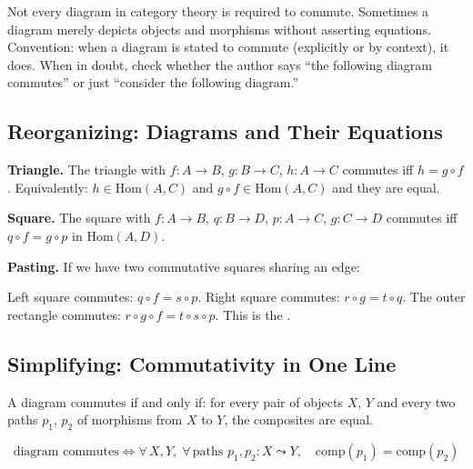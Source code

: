 Not every diagram in category theory is required to commute. Sometimes a
diagram merely depicts objects and morphisms without asserting equations.
Convention: when a diagram is stated to commute (explicitly or by context),
it does. When in doubt, check whether the author says ``the following diagram
commutes'' or just ``consider the following diagram.''

\subsection{Reorganizing: Diagrams and Their Equations}

\textbf{Triangle.} The triangle with $f : A \to B$, $g : B \to C$,
$h : A \to C$ commutes iff $h = g \circ f$. Equivalently: $h \in
\mathrm{Hom}(A, C)$ and $g \circ f \in \mathrm{Hom}(A, C)$ and they are
equal.

\textbf{Square.} The square with $f : A \to B$, $q : B \to D$, $p : A \to C$,
$g : C \to D$ commutes iff $q \circ f = g \circ p$ in $\mathrm{Hom}(A, D)$.

\textbf{Pasting.} If we have two commutative squares sharing an edge:

\medskip
\begin{center}
\end{center}
\medskip

Left square commutes: $q \circ f = s \circ p$. Right square commutes:
$r \circ g = t \circ q$. The outer rectangle commutes:
$r \circ g \circ f = t \circ s \circ p$. This is the .

\subsection{Simplifying: Commutativity in One Line}

A diagram commutes if and only if: for every pair of objects $X$, $Y$ and
every two paths $p_1$, $p_2$ of morphisms from $X$ to $Y$, the composites
are equal.

\[\text{diagram commutes} \iff
  \forall\, X, Y,\; \forall\, \text{paths } p_1, p_2 : X \leadsto Y,\quad
  \mathrm{comp}(p_1) = \mathrm{comp}(p_2)
\]

